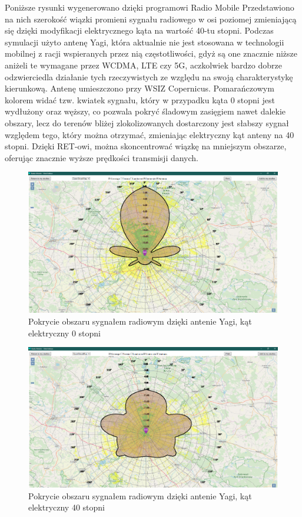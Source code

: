 		Poniższe rysunki wygenerowano dzięki programowi Radio Mobile \autocite{RADIO_MOBILE_PAGE_1}
		Przedstawiono na nich szerokość wiązki promieni sygnału radiowego w osi poziomej \autocite{BEAMWIDTH_1}
		zmieniającą się dzięki modyfikacji elektrycznego kąta na wartość 40-tu stopni.
		Podczas symulacji użyto antenę Yagi, która aktualnie nie jest stosowana w technologii mobilnej z racji wspieranych
		przez nią częstotliwości, gdyż są one znacznie niższe aniżeli te wymagane przez WCDMA, LTE czy 5G, 
		aczkolwiek bardzo dobrze odzwierciedla działanie tych rzeczywistych ze względu na swoją charakterystykę kierunkową.
		\newline
		Antenę umieszczono przy WSIZ Copernicus. \newline
		Pomarańczowym kolorem widać tzw. kwiatek sygnału, który w przypadku kąta 0 stopni jest wydłużony oraz węższy,
		co pozwala pokryć śladowym zasięgiem nawet dalekie obszary, lecz do terenów bliżej zlokolizowanych dostarczony
		jest słabszy sygnał względem tego, który można otrzymać, zmieniając elektryczny kąt anteny na 40 stopni.
		Dzięki RET-owi, można skoncentrować wiązkę na mniejszym obszarze, oferując znacznie wyższe prędkości transmisji danych.

		\begin{figure}[h!]
		\centering
		\includegraphics[scale=0.5]{Obrazki/Antenna_Yagi_Angle_0.png}
		\caption{Pokrycie obszaru sygnałem radiowym dzięki antenie Yagi, kąt elektryczny 0 stopni}
		\end{figure}

		\begin{figure}[h!]
		\centering
		\includegraphics[scale=0.5]{Obrazki/Antenna_Yagi_Angle_40.png}
		\caption{Pokrycie obszaru sygnałem radiowym dzięki antenie Yagi, kąt elektryczny 40 stopni}
		\end{figure}
